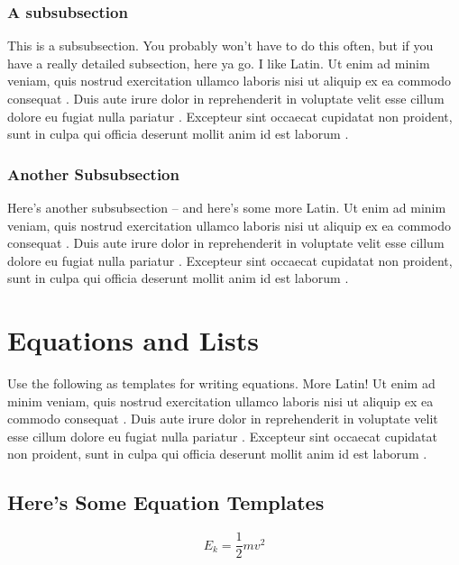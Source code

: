 \documentclass[journal,onecolumn]{IEEEtran}
\begin{document}
\subsubsection{A subsubsection}
This is a subsubsection. You probably won't have to do this often, but if you have a really detailed 
subsection, here ya go. I like Latin. Ut enim ad minim veniam, quis nostrud exercitation ullamco laboris nisi ut aliquip ex ea commodo consequat \cite{kanto:kanto}. Duis aute irure dolor in reprehenderit in voluptate velit esse cillum dolore eu fugiat nulla pariatur \cite{monge:monge}. Excepteur sint occaecat cupidatat non proident, sunt in culpa qui officia deserunt mollit anim id est laborum \cite{web:web}.
\\

\subsubsection{Another Subsubsection}
Here's another subsubsection -- and here's some more Latin. Ut enim ad minim veniam, quis nostrud exercitation ullamco laboris nisi ut aliquip ex ea commodo consequat \cite{kanto:kanto}. Duis aute irure dolor in reprehenderit in voluptate velit esse cillum dolore eu fugiat nulla pariatur \cite{monge:monge}. Excepteur sint occaecat cupidatat non proident, sunt in culpa qui officia deserunt mollit anim id est laborum \cite{web:web}.

\section{Equations and Lists}
Use the following as templates for writing equations. More Latin! Ut enim ad minim veniam, quis nostrud exercitation ullamco laboris nisi ut aliquip ex ea commodo consequat \cite{kanto:kanto}. Duis aute irure dolor in reprehenderit in voluptate velit esse cillum dolore eu fugiat nulla pariatur \cite{monge:monge}. Excepteur sint occaecat cupidatat non proident, sunt in culpa qui officia deserunt mollit anim id est laborum \cite{web:web}.

\subsection{Here's Some Equation Templates}

\begin{equation}
    \label{eq:kinetic_energy}
    E_{k} = \frac{1}{2}mv^{2}
\end{equation}
\end{document}
